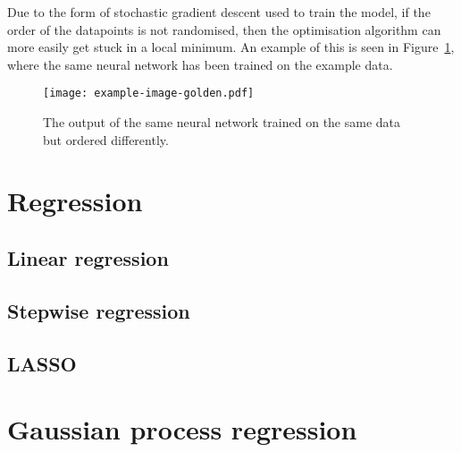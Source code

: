 Due to the form of stochastic gradient descent used to train the model, if the order of the datapoints is not randomised, then the optimisation algorithm can more easily get stuck in a local minimum.
An example of this is seen in Figure~\ref{fig:ann-order}, where the same neural network has been trained on the example data.

\begin{figure}[htbp]
	\centering
	\texttt{[image: example-image-golden.pdf]}
	\caption{The output of the same neural network trained on the same data but ordered differently.}
	\label{fig:ann-order}
\end{figure}


\section{Regression}
\subsection{Linear regression}
\subsection{Stepwise regression}
\subsection{LASSO}
\section{Gaussian process regression}
